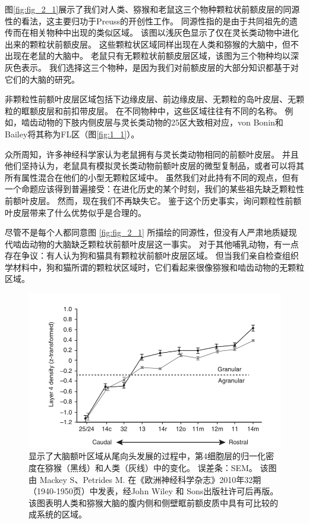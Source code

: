 图\ref{fig:fig_2_1}展示了我们对人类、猕猴和老鼠这三个物种颗粒状前额皮层的同源性的看法，这主要归功于Preuss\cite{Preuss1991a}的开创性工作。
同源性指的是由于共同祖先的遗传而在相关物种中出现的类似区域。
该图以浅灰色显示了仅在灵长类动物中进化出来的颗粒状前额皮层。
这些颗粒状区域同样出现在人类和猕猴的大脑中，但不出现在老鼠的大脑中。
老鼠只有无颗粒状前额皮层区域，该图为三个物种均以深灰色表示。
我们选择这三个物种，是因为我们对前额皮层的大部分知识都基于对它们的大脑的研究。


非颗粒性前额叶皮层区域包括下边缘皮层、前边缘皮层、无颗粒的岛叶皮层、无颗粒的眶额皮层和前扣带皮层。
在不同物种中，这些区域往往有不同的名称。
例如，啮齿动物的下肢内侧皮层与灵长类动物的25区大致相对应，von Bonin和Bailey将其称为FL区（图\ref{fig:1_1}）。


众所周知，许多神经科学家认为老鼠拥有与灵长类动物相同的前额叶皮层。
并且他们坚持认为，老鼠具有模拟灵长类动物前额叶皮层的微型复制品，或者可以将其所有属性混合在他们的小型无颗粒区域中\cite{kolb2007all,seamans2008comparing,schoenbaum2009new}。
虽然我们对此持有不同的观点，但有一个命题应该得到普遍接受：在进化历史的某个时刻，我们的某些祖先缺乏颗粒性前额叶皮层。
然而，现在我们不再缺失它。
鉴于这个历史事实，询问颗粒性前额叶皮层带来了什么优势似乎是合理的。


尽管不是每个人都同意图 \ref{fig:fig_2_1} 所描绘的同源性，但没有人严肃地质疑现代啮齿动物的大脑缺乏颗粒状前额叶皮层这一事实。
对于其他哺乳动物，有一点存在争议：有人认为狗\cite{rajkowska1988intrinsic}和猫\cite{je1948orbitofrontal}具有颗粒状前额叶皮层区域。
但当我们亲自检查组织学材料中，狗和猫所谓的颗粒状区域时，它们看起来很像猕猴和啮齿动物的无颗粒区域。

\begin{figure}[!htb]
	\centering
	\includegraphics[width=0.8\linewidth]{image_pfc/Fig_2_2}
	\caption{显示了大脑额叶区域从尾向头发展的过程中，第4细胞层的归一化密度在猕猴（黑线）和人类（灰线）中的变化。
		误差条：SEM。
		该图由 Mackey S、Petrides M. 在《欧洲神经科学杂志》2010年32期（1940-1950页）中发表，经John Wiley 和 Sons出版社许可后再版。
		该图表明人类和猕猴大脑的腹内侧和侧壁眶前额皮质中具有可比较的成系统的区域。\label{fig:fig_2_2}}
\end{figure}


